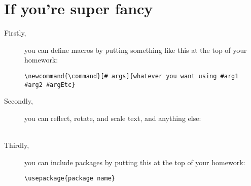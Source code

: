 \documentclass[11pt]{article}			%
\newcommand{\hooray}[1]{#1}
\begin{document}
\section{If you're super fancy}
\begin{description}
 \item[Firstly,]you can define macros by putting something like \hooray{this} at the top of your homework:
\begin{center} \verb|\newcommand{\command}[# args]{whatever you want using #arg1 #arg2 #argEtc}|\\ \end{center}


 \item[Secondly,]you can reflect, rotate, and scale text, and anything else:\\
\\

 \item[Thirdly,]you can include packages by putting this at the top of your homework:
\begin{center} \verb|\usepackage{package name}|\\ \end{center}

\end{description}
\end{document}
